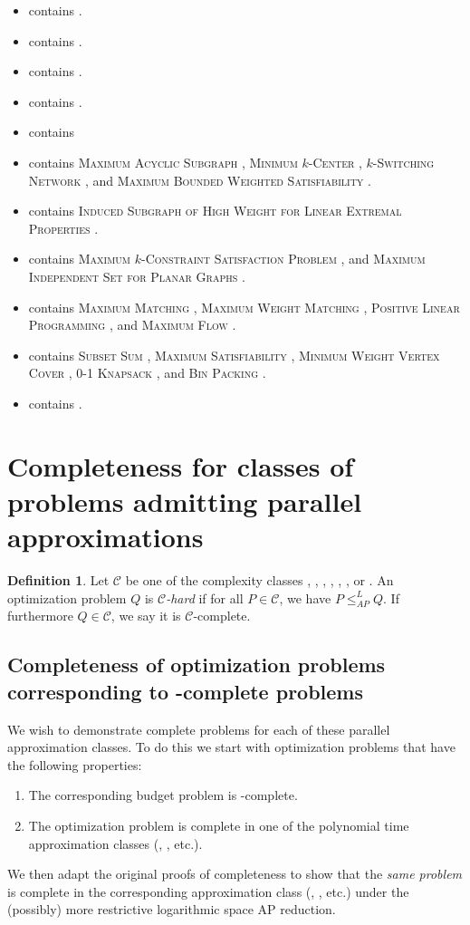 \documentclass[]{article}
\theoremstyle{plain}
\theoremstyle{definition}
\newtheorem{definition}{Definition}
\newcommand{\APr}{\leq_{AP}^{L}}
\newcommand{\npoproblems}{}
\newcommand{\nncoproblems}{}
\newcommand{\expapxncoproblems}{}
\newcommand{\polyapxncoproblems}{}
\newcommand{\logapxncoproblems}{}
\newcommand{\apxncoproblems}{%
  \textsc{Maximum Acyclic Subgraph} \cite[Section~7.4]{dsst97},
  \textsc{Minimum $k$-Center} \cite[Section~7.4]{dsst97},
  \textsc{$k$-Switching Network} \cite[Section~7.4]{dsst97}, and
  \textsc{Maximum Bounded Weighted Satisfiability} \cite[Theorem~4]{sx95}}
\newcommand{\apxncopproblems}{%
  \textsc{Induced Subgraph of High Weight for Linear Extremal Properties} \cite{dsst97}}
\newcommand{\ncasproblems}{%
  \textsc{Maximum $k$-Constraint Satisfaction Problem} \cite[Corollary~13]{trevisan98}, and
  \textsc{Maximum Independent Set for Planar Graphs} \cite[Theorem 6.4.1]{dsst97}}
\newcommand{\ncaspproblems}{%
  \textsc{Maximum Matching} \cite[Theorem~5.2.1]{dsst97},
  \textsc{Maximum Weight Matching} \cite[Theorem~5.2.2]{dsst97},
  \textsc{Positive Linear Programming} \cite[Theorem~5.1.11]{dsst97} \cite{tx98}, and
  \textsc{Maximum Flow} \cite[Theorem~5.2.2]{dsst97}}
\newcommand{\fncasproblems}{%
  \textsc{Subset Sum} \cite[Theorem~4.1.4]{dsst97},
  \textsc{Maximum Satisfiability} \cite[Theorem~8]{trevisan98},
  \textsc{Minimum Weight Vertex Cover} \cite[Theorem~5.3.6]{dsst97},
  \textsc{0-1 Knapsack} \cite[Theorem~2]{mayr88}, and
  \textsc{Bin Packing} \cite[Theorem~3]{mayr88}}
\newcommand{\ncoproblems}{}
\begin{document}
\begin{itemize}
\item \NPO{} contains \npoproblems.
\item \NNCO{} contains \nncoproblems.
\item \expApxNCO{} contains \expapxncoproblems.
\item \polyApxNCO{} contains \polyapxncoproblems.
\item \logApxNCO{} contains \logapxncoproblems
\item \ApxNCO{} contains \apxncoproblems.
\item \ApxNCOp{} contains \apxncopproblems.
\item \NCAS{} contains \ncasproblems.
\item \NCASp{} contains \ncaspproblems.
\item \FNCAS{} contains \fncasproblems.
\item \NCO{} contains \ncoproblems.
\end{itemize}

\section{Completeness for classes of problems admitting parallel approximations}
\label{sec:completeness}

\begin{definition}
  Let $\mathcal{C}$ be one of the complexity classes \NCO, \NCAS, \ApxNCO, \logApxNCO, \polyApxNCO, \expApxNCO, or \NNCO.
  An optimization problem $Q$ is \emph{$\mathcal{C}$-hard} if for all $P\in\mathcal{C}$, we have $P\APr Q$.
  If furthermore $Q\in\mathcal{C}$, we say it is $\mathcal{C}$-complete.
\end{definition}

\subsection{Completeness of optimization problems corresponding to \texorpdfstring{\NP}{NP}-complete problems}

We wish to demonstrate complete problems for each of these parallel approximation classes.
To do this we start with optimization problems that have the following properties:
\begin{enumerate}
\item The corresponding budget problem is \NP-complete.
\item The optimization problem is complete in one of the polynomial time approximation classes (\ApxPO, \PTAS, etc.).
\end{enumerate}
We then adapt the original proofs of completeness to show that the \emph{same problem} is complete in the corresponding \NC{} approximation class (\ApxNCO, \NCAS, etc.) under the (possibly) more restrictive logarithmic space AP reduction.
\end{document}

